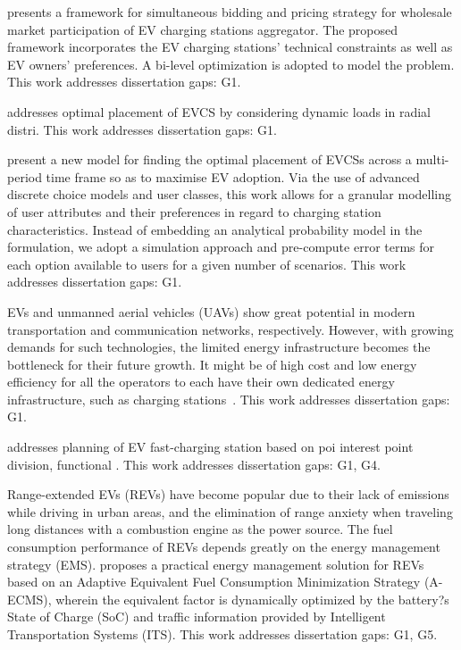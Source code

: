 \documentclass[letterpaper, 12pt, oneside, doublespacing]{Thesis}
\begin{document}
\noindent \cite{ev_charging_2022} presents a framework for simultaneous bidding and pricing strategy for wholesale market participation of EV charging stations aggregator. The proposed framework incorporates the EV charging stations' technical constraints as well as EV owners' preferences. A bi-level optimization is adopted to model the problem. This work addresses dissertation gaps: G1.



\noindent \cite{optimal_placement_2022} addresses optimal placement of EVCS by considering dynamic loads in radial distri. This work addresses dissertation gaps: G1.



\noindent \cite{optimising_electric_2022} present a new model for finding the optimal placement of EVCSs across a multi-period time frame so as to maximise EV adoption. Via the use of advanced discrete choice models and user classes, this work allows for a granular modelling of user attributes and their preferences in regard to charging station characteristics. Instead of embedding an analytical probability model in the formulation, we adopt a simulation approach and pre-compute error terms for each option available to users for a given number of scenarios. This work addresses dissertation gaps: G1.



\noindent EVs and unmanned aerial vehicles (UAVs) show great potential in modern transportation and communication networks, respectively. However, with growing demands for such technologies, the limited energy infrastructure becomes the bottleneck for their future growth. It might be of high cost and low energy efficiency for all the operators to each have their own dedicated energy infrastructure, such as charging stations~\cite{performance_analysis_2022}. This work addresses dissertation gaps: G1.



\noindent \cite{planning_of_2022} addresses planning of EV fast-charging station based on poi interest point division, functional . This work addresses dissertation gaps: G1, G4.



\noindent Range-extended EVs (REVs) have become popular due to their lack of emissions while driving in urban areas, and the elimination of range anxiety when traveling long distances with a combustion engine as the power source. The fuel consumption performance of REVs depends greatly on the energy management strategy (EMS). \cite{predictive_energy_2022} proposes a practical energy management solution for REVs based on an Adaptive Equivalent Fuel Consumption Minimization Strategy (A-ECMS), wherein the equivalent factor is dynamically optimized by the battery?s State of Charge (SoC) and traffic information provided by Intelligent Transportation Systems (ITS). This work addresses dissertation gaps: G1, G5.
\end{document}
